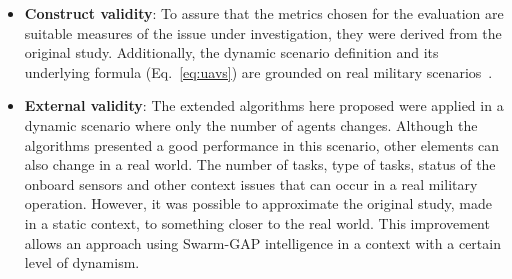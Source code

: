 \begin{itemize}
   \item \textbf{Construct validity}: To assure that the metrics chosen for the evaluation are suitable measures of the issue under investigation, they were derived from the original study. Additionally, the dynamic scenario definition and its underlying formula (Eq.~\ref{eq:uavs}) are grounded on real military scenarios~\citep{CC02}.
   
   
   \item \textbf{External validity}: The extended algorithms here proposed were applied in a dynamic scenario where only the number of agents changes. Although the algorithms presented a good performance in this scenario, other elements can also change in a real world. The number of tasks, type of tasks, status of the onboard sensors and other context issues that can occur in a real military operation. However, it was possible to approximate the original study, made in a static context, to something closer to the real world. This improvement allows an approach using Swarm-GAP intelligence in a context with a certain level of dynamism.
\end{itemize}

